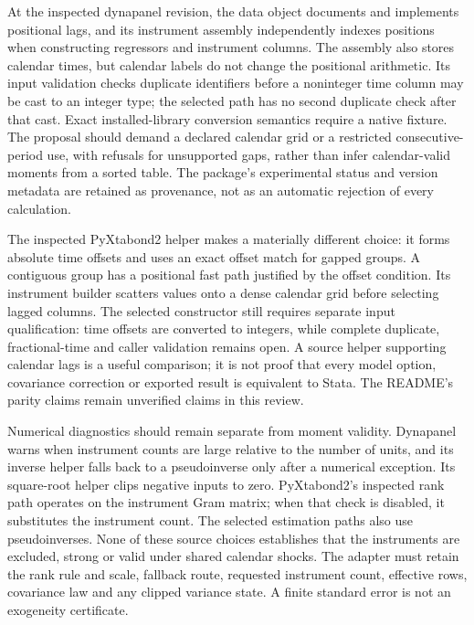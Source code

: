 At the inspected dynapanel revision, the data object documents and implements positional lags, and its instrument assembly independently indexes positions when constructing regressors and instrument columns. The assembly also stores calendar times, but calendar labels do not change the positional arithmetic. Its input validation checks duplicate identifiers before a noninteger time column may be cast to an integer type; the selected path has no second duplicate check after that cast. Exact installed-library conversion semantics require a native fixture. The proposal should demand a declared calendar grid or a restricted consecutive-period use, with refusals for unsupported gaps, rather than infer calendar-valid moments from a sorted table. The package's experimental status and version metadata are retained as provenance, not as an automatic rejection of every calculation.\citep{exec25_pydyn_dynapanel}

The inspected PyXtabond2 helper makes a materially different choice: it forms absolute time offsets and uses an exact offset match for gapped groups. A contiguous group has a positional fast path justified by the offset condition. Its instrument builder scatters values onto a dense calendar grid before selecting lagged columns. The selected constructor still requires separate input qualification: time offsets are converted to integers, while complete duplicate, fractional-time and caller validation remains open. A source helper supporting calendar lags is a useful comparison; it is not proof that every model option, covariance correction or exported result is equivalent to Stata. The README's parity claims remain unverified claims in this review.\citep{exec25_pydyn_xtabond}

Numerical diagnostics should remain separate from moment validity. Dynapanel warns when instrument counts are large relative to the number of units, and its inverse helper falls back to a pseudoinverse only after a numerical exception. Its square-root helper clips negative inputs to zero. PyXtabond2's inspected rank path operates on the instrument Gram matrix; when that check is disabled, it substitutes the instrument count. The selected estimation paths also use pseudoinverses. None of these source choices establishes that the instruments are excluded, strong or valid under shared calendar shocks. The adapter must retain the rank rule and scale, fallback route, requested instrument count, effective rows, covariance law and any clipped variance state. A finite standard error is not an exogeneity certificate.\citep{exec25_pydyn_dynapanel,exec25_pydyn_xtabond,exec25_pydyn_choice}


